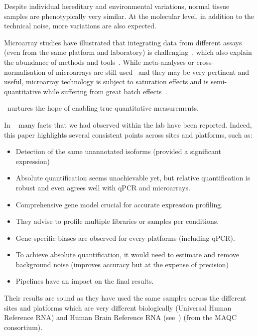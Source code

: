 Despite individual hereditary and environmental variations,
normal tissue samples are phenotypically very similar.
At the molecular level, in addition to the technical noise,
more variations are also expected.

Microarray studies have illustrated that integrating data
from different assays (even from the same platform and laboratory)
is challenging~,
which also explain the abundance of methods and tools~.
While meta-analyses or cross-normalisation of microarrays are still
used~ and they may be very pertinent and
useful,
microarray technology is subject to saturation effects and is semi-quantitative
while suffering from great batch effects~.

\Rnaseq\ nurtures the hope of enabling true quantitative measurements.


In ~ many facts that
we had observed within the lab have been reported.
Indeed, this paper highlights several consistent points
across sites and platforms,
such as:
\begin{itemize}[topsep=0pt,nolistsep,noitemsep]
        \setlength{\itemsep}{1pt}
        \setlength{\parskip}{0pt}
        \setlength{\parsep}{0pt}
    \item Detection of the same unannotated isoforms (provided a significant expression)
    \item Absolute quantification seems unachievable yet,
        but relative quantification is robust and even agrees well with \gls{qPCR}
        and microarrays.
    \item Comprehensive gene model crucial for accurate expression profiling.
    \item They advise to profile multiple libraries or samples per conditions.
    \item Gene-specific biases are observed for every platforms
        (including \gls{qPCR}).
    \item To achieve absolute quantification, it would need to estimate and
        remove background noise (improves accuracy but at the expense of precision)
    \item Pipelines have an impact on the final results.
\end{itemize}

Their results are sound as they have used the same samples across the different
sites and platforms which are very different biologically (Universal
Human Reference RNA) and Human Brain Reference RNA
(see~) (from the \gls{MAQC} consortium).

